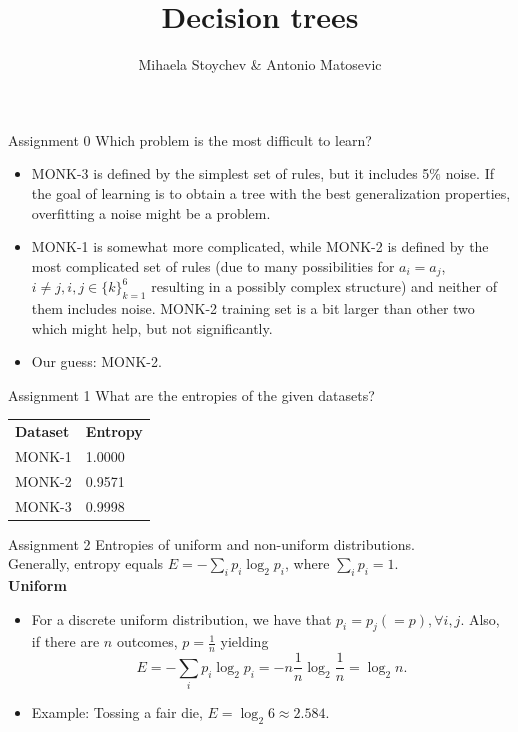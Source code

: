\documentclass{beamer}
\title{\huge Decision trees}
\date{}
\author{\large Mihaela Stoychev \& Antonio Matosevic}
\institute{ DD2421 Machine Learning, KTH}
\begin{document}
\begin{frame}
\titlepage
\end{frame}

\begin{frame}{Assignment 0}
Which problem is the most difficult to learn?
\begin{itemize}
\item MONK-3 is defined by the simplest set of rules, but it includes 5$\%$ noise. If the goal of learning is to obtain a tree with the best generalization properties, overfitting a noise might be a problem.
\item MONK-1 is somewhat more complicated, while MONK-2 is defined by the most complicated set of rules (due to many possibilities for $a_i = a_j$, $ i \neq j, i,j \in \{k\}_{k = 1}^6$ resulting in a possibly complex structure) and neither of them includes noise. MONK-2 training set is a bit larger than other two which might help, but not significantly.
\item Our guess: MONK-2.
\end{itemize} 

\end{frame}


\begin{frame}{Assignment 1}
What are the entropies of the given datasets?\\[5mm]
\begin{table}[H]
\begin{tabular}{|P{30mm}|P{30mm}|}
\hline
\textbf{Dataset} & \textbf{Entropy} \\ \hhline{|=|=|}
MONK-1           & 1.0000           \\ \hline
MONK-2           & 0.9571           \\ \hline
MONK-3           & 0.9998           \\ \hline
\end{tabular}
\end{table}

\end{frame}


\begin{frame}{Assignment 2}
Entropies of uniform and non-uniform distributions.\\
Generally, entropy equals $E = - \sum\limits_i p_i \log_2 p_i$, where $\sum \limits_i p_i = 1$.\\
\textbf{Uniform}
\begin{itemize}
\item For a discrete uniform distribution, we have that $p_i = p_j (= p), \forall i, j$. Also, if there are $n$ outcomes, $p = \frac{1}{n}$ yielding $$E = - \sum \limits_i p_i \log_2 p_i = - n \frac{1}{n}\log_2 \frac{1}{n} =  \log_2 n.$$

\item Example: Tossing a fair die, $E = \log_2 6 \approx 2.584.$
\end{itemize}

\end{frame}
\end{document}

